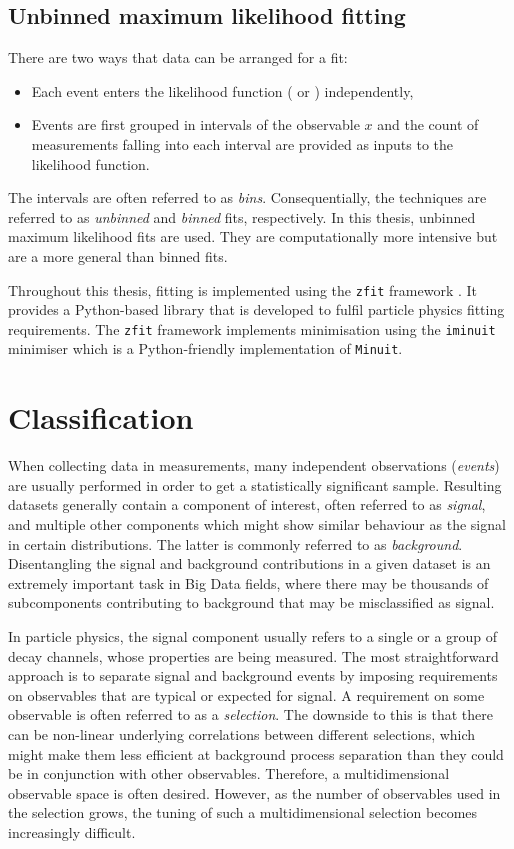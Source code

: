 \subsection{Unbinned maximum likelihood fitting}

There are two ways that data can be arranged for a fit: 

\begin{itemize}
    \item Each event enters the likelihood function ( or ) independently,
    \item Events are first grouped in intervals of the observable $x$ and the count of measurements falling into each interval are provided as inputs to the likelihood function.
\end{itemize}
The intervals are often referred to as \textit{bins}. 
Consequentially, the techniques are referred to as \textit{unbinned} and \textit{binned} fits, respectively.
In this thesis, unbinned maximum likelihood fits are used. 
They are computationally more intensive but are a more general than binned fits. 

Throughout this thesis, fitting is implemented using the \texttt{zfit} framework \cite{ESCHLE2020100508}. 
It provides a Python-based library that is developed to fulfil particle physics fitting requirements.
The \texttt{zfit} framework implements minimisation using the \texttt{iminuit} minimiser \cite{iminuit} which is a Python-friendly implementation of \texttt{Minuit}.

\section{Classification}\label{sec:classification}
When collecting data in measurements, many independent observations (\textit{events}) are usually performed in order to get a statistically significant sample.
Resulting datasets generally contain a component of interest, often referred to as \textit{signal}, and multiple other components which might show similar behaviour as the signal in certain distributions. 
The latter is commonly referred to as \textit{background}. Disentangling the signal and background contributions in a given dataset is an extremely important task in Big Data fields, where there may be thousands of subcomponents contributing to background that may be misclassified as signal.

In particle physics, the signal component usually refers to a single or a group of decay channels, whose properties are being measured. 
The most straightforward approach is to separate signal and background events by imposing requirements on observables that are typical or expected for signal.
A requirement on some observable is often referred to as a \textit{selection}.
The downside to this is that there can be non-linear underlying correlations between different selections, which might make them less efficient at background process separation than they could be in conjunction with other observables. 
Therefore, a multidimensional observable space is often desired.
However, as the number of observables used in the selection grows, the tuning of such a multidimensional selection becomes increasingly difficult.


